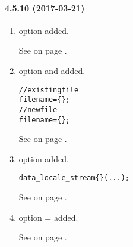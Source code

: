 \paragraph{4.5.10 (2017-03-21)}
\begin{enumerate}

\item \FORM{} option \EXPAND{} added.

  See  on page \pageref{dia:uiformoptionlist}.

\item \FILENAME{} option \OPEN{} and \SAVE{} added. \\
  \begin{boxedminipage}[t]{\linewidth}
    \begin{alltt}
// existing file
filename = \FILENAME \{ \OPEN{} \};
// new file
filename = \FILENAME \{ \SAVE{} \};
    \end{alltt}
  \end{boxedminipage}

  See  on page \pageref{dia:fileexpression}.

\item \STREAM{} option \LOCALE{} added. \\
  \begin{boxedminipage}[t]{\linewidth}
    \begin{alltt}
\STREAMER
  data_locale_stream \{\LOCALE\} ( ... );
    \end{alltt}
  \end{boxedminipage}

  See  on page \pageref{dia:stoptionlist}.

\item \FIELDGROUP{} option \ARROWS=\HIDDEN{} added.

  See  on page \pageref{dia:uifieldgroupoption}.

\end{enumerate}
